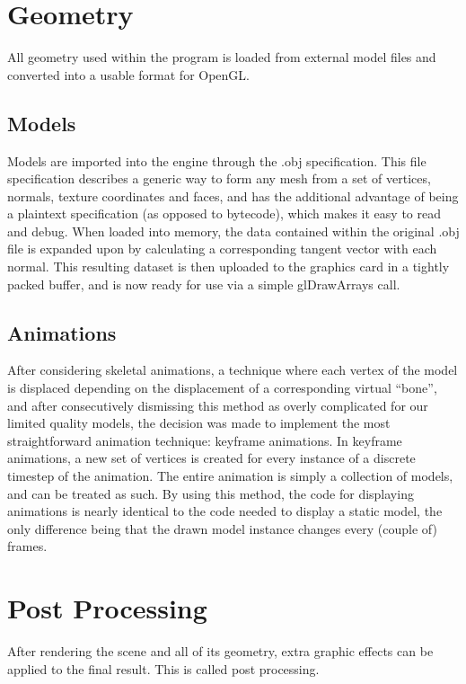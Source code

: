 \section{Geometry}
All geometry used within the program is loaded from external model files and converted into a usable format for OpenGL.

\subsection{Models}
Models are imported into the engine through the .obj specification. This file specification describes a generic way to form any mesh from a set of vertices, normals, texture coordinates and faces, and has the additional advantage of being a plaintext specification (as opposed to bytecode), which makes it easy to read and debug. When loaded into memory, the data contained within the original .obj file is expanded upon by calculating a corresponding tangent vector with each normal. This resulting dataset is then uploaded to the graphics card in a tightly packed buffer, and is now ready for use via a simple glDrawArrays call.
\subsection{Animations}

After considering skeletal animations, a technique where each vertex of the model is displaced depending on the displacement of a corresponding virtual ``bone'', and after consecutively dismissing this method as overly complicated for our limited quality models, the decision was made to implement the most straightforward animation technique: keyframe animations. In keyframe animations, a new set of vertices is created for every instance of a discrete timestep of the animation. The entire animation is simply a collection of models, and can be treated as such. By using this method, the code for displaying animations is nearly identical to the code needed to display a static model, the only difference being that the drawn model instance changes every (couple of) frames.

\section{Post Processing}
After rendering the scene and all of its geometry, extra graphic effects can be applied to the final result. This is called post processing.
